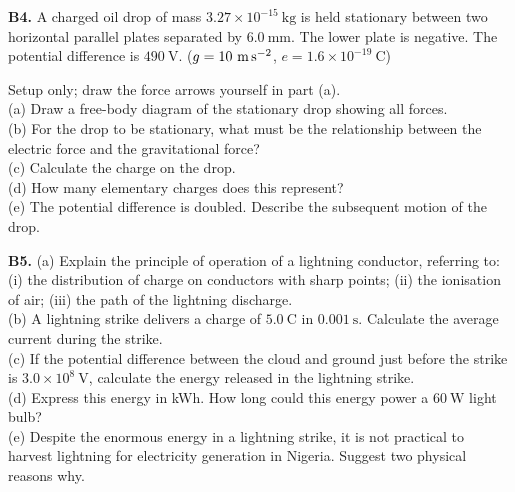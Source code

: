 \begin{exercisebox}[21]
\vspace{0.4cm}

\textbf{B4.} A charged oil drop of mass
$3.27\times10^{-15}\ \text{kg}$ is held stationary
between two horizontal parallel plates separated
by $6.0\ \text{mm}$. The lower plate is negative.
The potential difference is $490\ \text{V}$.
($g = 10\ \text{m\,s}^{-2}$,
$e = 1.6\times10^{-19}\ \text{C}$)\\[4pt]
\begin{center}
\end{center}
\small Setup only; draw the force arrows yourself in part (a).\\[4pt]
(a) Draw a free-body diagram of the stationary
drop showing all forces.\\
(b) For the drop to be stationary, what must be
the relationship between the electric force and
the gravitational force?\\
(c) Calculate the charge on the drop.\\
(d) How many elementary charges does this represent?\\
(e) The potential difference is doubled. Describe
the subsequent motion of the drop.
\hfill{}

\vspace{0.4cm}

\textbf{B5.} (a) Explain the principle of operation
of a lightning conductor, referring to:
(i) the distribution of charge on conductors with
sharp points; (ii) the ionisation of air; (iii) the
path of the lightning discharge.\\[4pt]
(b) A lightning strike delivers a charge of
$5.0\ \text{C}$ in $0.001\ \text{s}$.
Calculate the average current during the strike.\\[4pt]
(c) If the potential difference between the cloud
and ground just before the strike is
$3.0\times10^8\ \text{V}$, calculate the energy
released in the lightning strike.\\[4pt]
(d) Express this energy in kWh. How long could this
energy power a $60\ \text{W}$ light bulb?\\[4pt]
(e) Despite the enormous energy in a lightning
strike, it is not practical to harvest lightning
for electricity generation in Nigeria. Suggest
two physical reasons why.
\hfill{}

\end{exercisebox}
